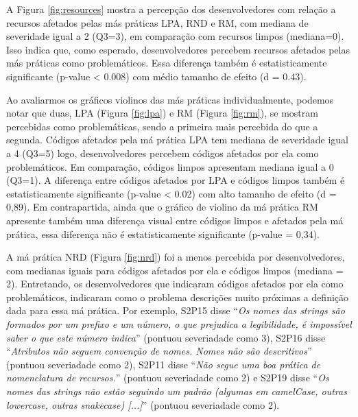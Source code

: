 A Figura \ref{fig:resources} mostra a percepção dos desenvolvedores com relação a recursos afetados pelas más práticas \textsc{LPA}, RND e \textsc{RM}, com mediana de severidade igual a 2 (Q3=3), em comparação com recursos limpos (mediana=0). Isso indica que, como esperado, desenvolvedores percebem recursos afetados pelas más práticas como problemáticos. Essa diferença também é estatisticamente significante (p-value < 0.008) com médio tamanho de efeito (d = 0.43).


Ao avaliarmos os gráficos violinos das más práticas individualmente, podemos notar que duas, \textsc{LPA} (Figura \ref{fig:lpa}) e \textsc{RM} (Figura \ref{fig:rm}), se mostram percebidas como problemáticas, sendo a primeira mais percebida do que a segunda. Códigos afetados pela má prática \textsc{LPA} tem mediana de severidade igual a 4 (Q3=5) logo, desenvolvedores percebem códigos afetados por ela como problemáticos. Em comparação, códigos limpos apresentam mediana igual a 0 (Q3=1). A diferença entre códigos afetados por \textsc{LPA} e códigos limpos também é estatisticamente significante (p-value < 0.02) com alto tamanho de efeito (d = 0,89). Em contrapartida, ainda que o gráfico de violino da má prática \textsc{RM} apresente também uma diferença visual entre códigos limpos e afetados pela má prática, essa diferença não é estatisticamente significante (p-value = 0,34).

A má prática \textsc{NRD} (Figura \ref{fig:nrd}) foi a menos percebida por desenvolvedores, com medianas iguais para códigos afetados por ela e códigos limpos (mediana = 2). Entretando, os desenvolvedores que indicaram códigos afetados por ela como problemáticos, indicaram como o problema descrições muito próximas a definição dada para essa má prática. Por exemplo, S2P15 disse ``\textit{Os nomes das strings são formados por um prefixo e um número, o que prejudica a legibilidade, é impossível saber o que este número indica}'' (pontuou severiadade como 3), S2P16 disse ``\textit{Atributos não seguem convenção de nomes. Nomes não são descritivos}'' (pontuou severiadade como 2), S2P11 disse ``\textit{Não segue uma boa prática de nomenclatura de recursos.}'' (pontuou severiadade como 2) e S2P19 disse ``\textit{Os nomes das strings não estão seguindo um padrão (algumas em camelCase, outras lowercase, outras snakecase) [...]}'' (pontuou severiadade como 2). \\


